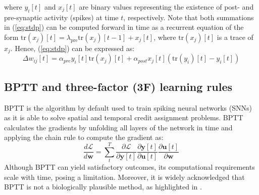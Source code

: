 \documentclass[10pt]{article} %
\renewcommand\hl[1]{#1}
\begin{document}
    where $y_i[t]$ and $x_j[t]$ are binary values representing the existence of post- and pre-synaptic activity (spikes) at time $t$, respectively. 
    Note that both summations in (\ref{eq:stdp}) can be computed forward in time as a recurrent equation of the form \hl{$\mathrm{tr}(x_j)[t]=\lambda_{\mathrm{pre}} \mathrm{tr}(x_j)[t-1] + x_j[t]$, where $\mathrm{tr}(x_j)[t]$ is a trace of $x_j$.}
    Hence, (\ref{eq:stdp}) can be expressed 
    as:
    \begin{equation}
        \label{eq:stdp_ft}
        \Delta w_{ij}[t] = \alpha_{pre} y_i[t]\mathrm{tr}(x_j)[t] + \alpha_{post}x_j[t](\mathrm{tr}(y_i)[t] - y_i[t]) 
    \end{equation}

        
    \subsection{BPTT and three-factor (3F) learning rules}\label{sec:bptt_3flr}
    BPTT is the algorithm by default used to train spiking neural networks (SNNs) as it is able to solve spatial and temporal credit assignment problems.
    BPTT calculates the gradients by unfolding all layers of the network in time and applying the chain rule to compute the gradient as:
    \begin{equation}
    \frac{d \mathcal{L}}{d \boldsymbol{w}} = \sum_t^T\frac{\partial \boldsymbol{\mathcal{L}}}{\partial \boldsymbol{y}[t]} \frac{\partial \boldsymbol{y}[t]}{\partial \boldsymbol{u}[t]} \frac{\partial \boldsymbol{u}[t]}{\partial \boldsymbol{w}}
    \label{eq:bppt}
    \end{equation}
    Although BPTT can yield satisfactory outcomes, its computational requirements scale with time, posing a limitation.
    Moreover, it is widely acknowledged that BPTT is not a biologically plausible method, as highlighted in \cite{Lillicrap2019BackpropagationBrain}.
    
\end{document}

